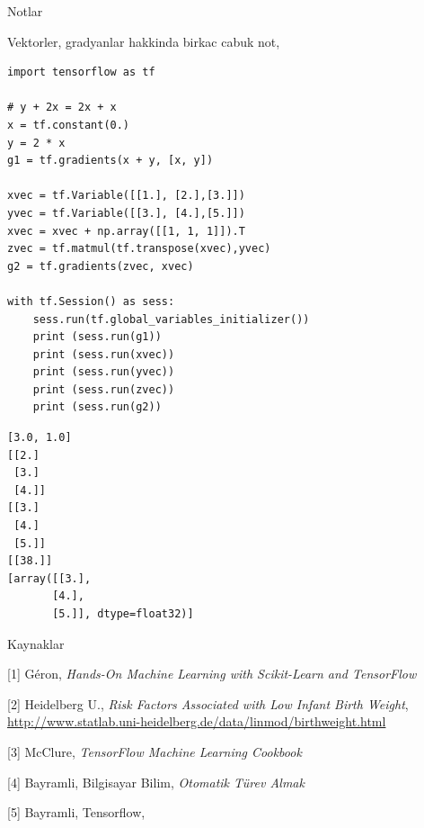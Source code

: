 \documentclass[12pt,fleqn]{article}\usepackage{../../common}
\begin{document}
Notlar

Vektorler, gradyanlar hakkinda birkac cabuk not,

\begin{verbatim}
import tensorflow as tf

# y + 2x = 2x + x
x = tf.constant(0.)
y = 2 * x
g1 = tf.gradients(x + y, [x, y])

xvec = tf.Variable([[1.], [2.],[3.]]) 
yvec = tf.Variable([[3.], [4.],[5.]]) 
xvec = xvec + np.array([[1, 1, 1]]).T
zvec = tf.matmul(tf.transpose(xvec),yvec)
g2 = tf.gradients(zvec, xvec)

with tf.Session() as sess:
    sess.run(tf.global_variables_initializer())
    print (sess.run(g1))
    print (sess.run(xvec))
    print (sess.run(yvec))
    print (sess.run(zvec))
    print (sess.run(g2))
\end{verbatim}

\begin{verbatim}
[3.0, 1.0]
[[2.]
 [3.]
 [4.]]
[[3.]
 [4.]
 [5.]]
[[38.]]
[array([[3.],
       [4.],
       [5.]], dtype=float32)]
\end{verbatim}

Kaynaklar 

[1] Géron, {\em Hands-On Machine Learning with Scikit-Learn and TensorFlow}

[2] Heidelberg U., {\em Risk Factors Associated with Low Infant Birth Weight}, \url{http://www.statlab.uni-heidelberg.de/data/linmod/birthweight.html}

[3] McClure, {\em TensorFlow Machine Learning Cookbook}

[4] Bayramli, Bilgisayar Bilim, {\em Otomatik Türev Almak}

[5] Bayramli, Tensorflow, 
\end{document}
